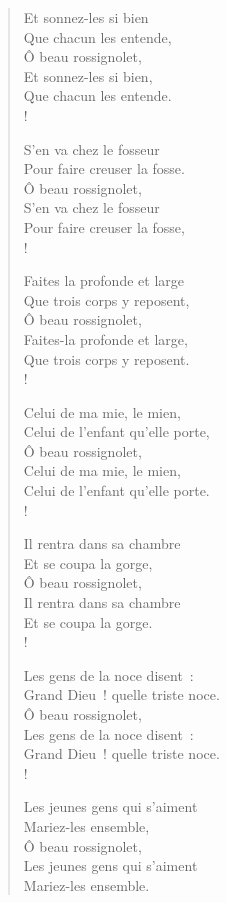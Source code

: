 \documentclass[french,twoside]{book} %
\begin{document}
\begin{verse}
Et sonnez-les si bien\\
Que chacun les entende,\\
Ô beau rossignolet,\\
Et sonnez-les si bien,\\
Que chacun les entende.\\!

S’en va chez le fosseur\\
Pour faire creuser la fosse.\\
Ô beau rossignolet,\\
S’en va chez le fosseur\\
Pour faire creuser la fosse,\\!

Faites la profonde et large\\
Que trois corps y reposent,\\
Ô beau rossignolet,\\
Faites-la profonde et large,\\
Que trois corps y reposent.\\!

Celui de ma mie, le mien,\\
Celui de l’enfant qu’elle porte,\\
Ô beau rossignolet,\\
Celui de ma mie, le mien,\\
Celui de l’enfant qu’elle porte.\\!

Il rentra dans sa chambre\\
Et se coupa la gorge,\\
Ô beau rossignolet,\\
Il rentra dans sa chambre\\
Et se coupa la gorge.\\!

Les gens de la noce disent :\\
Grand Dieu ! quelle triste noce.\\
Ô beau rossignolet,\\
Les gens de la noce disent :\\
Grand Dieu ! quelle triste noce.\\!

Les jeunes gens qui s’aiment\\
Mariez-les ensemble,\\
Ô beau rossignolet,\\
Les jeunes gens qui s’aiment\\
Mariez-les ensemble.\\
\end{verse}
\end{document}
